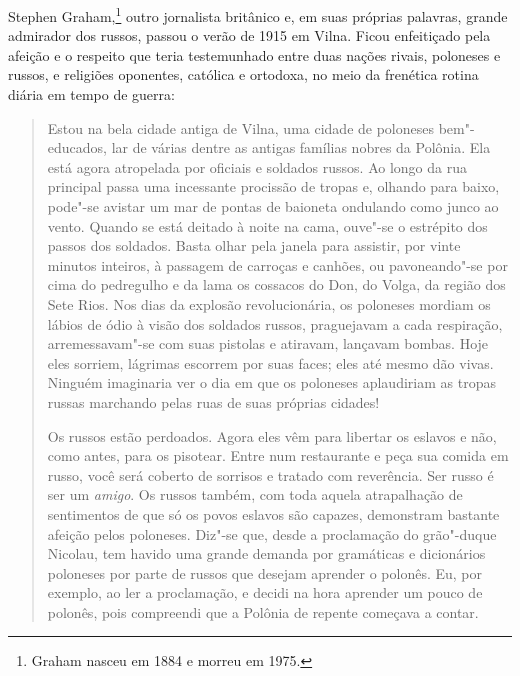 
Stephen Graham,\footnote{Graham nasceu em 1884 e morreu em 1975.} outro jornalista britânico e, em suas
próprias palavras, grande admirador dos russos, passou o verão de 1915
em Vilna. Ficou enfeitiçado pela afeição e o respeito que teria
testemunhado entre duas nações rivais, poloneses e russos, e religiões
oponentes, católica e ortodoxa, no meio da frenética rotina diária em
tempo de guerra:

\begin{quote}
Estou na bela cidade antiga de Vilna, uma cidade de poloneses
bem"-educados, lar de várias dentre as antigas famílias nobres da
Polônia. Ela está agora atropelada por oficiais e soldados russos. Ao
longo da rua principal passa uma incessante procissão de tropas e,
olhando para baixo, pode"-se avistar um mar de pontas de baioneta
ondulando como junco ao vento. Quando se está deitado à noite na cama,
ouve"-se o estrépito dos passos dos soldados. Basta olhar pela janela
para assistir, por vinte minutos inteiros, à passagem de carroças e
canhões, ou pavoneando"-se por cima do pedregulho e da lama os cossacos
do Don, do Volga, da região dos Sete Rios. Nos dias da explosão
revolucionária, os poloneses mordiam os lábios de ódio à visão dos
soldados russos, praguejavam a cada respiração, arremessavam"-se com suas
pistolas e atiravam, lançavam bombas. Hoje eles sorriem, lágrimas
escorrem por suas faces; eles até mesmo dão vivas. Ninguém imaginaria
ver o dia em que os poloneses aplaudiriam as tropas russas marchando
pelas ruas de suas próprias cidades!

Os russos estão perdoados. Agora eles vêm para libertar os eslavos e
não, como antes, para os pisotear. Entre num restaurante e peça sua
comida em russo, você será coberto de sorrisos e tratado com reverência.
Ser russo é ser um \textit{amigo}. Os russos também, com toda aquela
atrapalhação de sentimentos de que só os povos eslavos são capazes,
demonstram bastante afeição pelos poloneses. Diz"-se que, desde a
proclamação do grão"-duque Nicolau, tem havido uma grande demanda por
gramáticas e dicionários poloneses por parte de russos que desejam
aprender o polonês. Eu, por exemplo, ao ler a proclamação, e 
decidi na hora aprender um pouco de polonês, pois compreendi que a
Polônia de repente começava a contar.


\end{quote}
